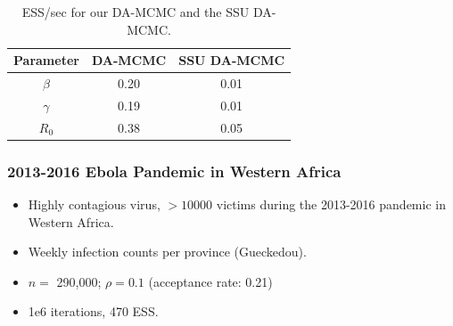 \documentclass{beamer}
\begin{document}
\begin{frame}
	
	\begin{table}
		\centering
		\begin{tabular}{ c|cc}
			Parameter & DA-MCMC & SSU DA-MCMC \\ 
			\hline
			$\beta$ & 0.20 & 0.01 \\ 
			$\gamma$ & 0.19 & 0.01 \\ 
			$R_0$ & 0.38 & 0.05 \\
			\hline
		\end{tabular}
		\caption{ESS/sec for our DA-MCMC and the SSU DA-MCMC.}
		\label{tab:E6}
	\end{table}
	
	
\end{frame}


\begin{frame} \frametitle{2013-2016 Ebola Pandemic in Western Africa}  
	\begin{itemize}
		\item Highly contagious virus, $>10000$ victims during the 2013-2016 pandemic in Western Africa.
		\item Weekly infection counts per province (Gueckedou).
		\item $n =$ 290,000; $\rho = 0.1$ (acceptance rate: 0.21)
		\item 1e6 iterations, 470 ESS.
	\end{itemize} 
	

\end{frame}
\end{document}
